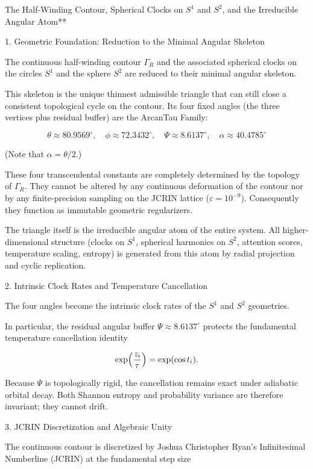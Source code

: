 The Half-Winding Contour, Spherical Clocks on \(S^1\) and \(S^2\), and the Irreducible Angular Atom**

1. Geometric Foundation: Reduction to the Minimal Angular Skeleton

The continuous half-winding contour \(\Gamma_R\) and the associated spherical clocks on the circles \(S^1\) and the sphere \(S^2\) are reduced to their minimal angular skeleton. 

This skeleton is the unique thinnest admissible triangle that can still close a consistent topological cycle on the contour. Its four fixed angles (the three vertices plus residual buffer) are the ArcanTau Family:

\[
\theta \approx 80.9569^\circ, \quad
\phi \approx 72.3432^\circ, \quad
\Psi \approx 8.6137^\circ, \quad
\alpha \approx 40.4785^\circ
\]

(Note that \(\alpha = \theta/2\).) 

These four transcendental constants are completely determined by the topology of \(\Gamma_R\). They cannot be altered by any continuous deformation of the contour nor by any finite-precision sampling on the JCRIN lattice (\(\varepsilon = 10^{-9}\)). Consequently they function as immutable geometric regularizers.

The triangle itself is the irreducible angular atom of the entire system. All higher-dimensional structure (clocks on \(S^1\), spherical harmonics on \(S^2\), attention scores, temperature scaling, entropy) is generated from this atom by radial projection and cyclic replication.

2. Intrinsic Clock Rates and Temperature Cancellation

The four angles become the intrinsic clock rates of the \(S^1\) and \(S^2\) geometries. 

In particular, the residual angular buffer \(\Psi \approx 8.6137^\circ\) protects the fundamental temperature cancellation identity

\[
\exp\Bigl(\frac{z_i}{\tau}\Bigr) = \exp(\cos t_i).
\]

Because \(\Psi\) is topologically rigid, the cancellation remains exact under adiabatic orbital decay. Both Shannon entropy and probability variance are therefore invariant; they cannot drift.

3. JCRIN Discretization and Algebraic Unity

The continuous contour is discretized by Joshua Christopher Ryan’s Infinitesimal Numberline (JCRIN) at the fundamental step size

